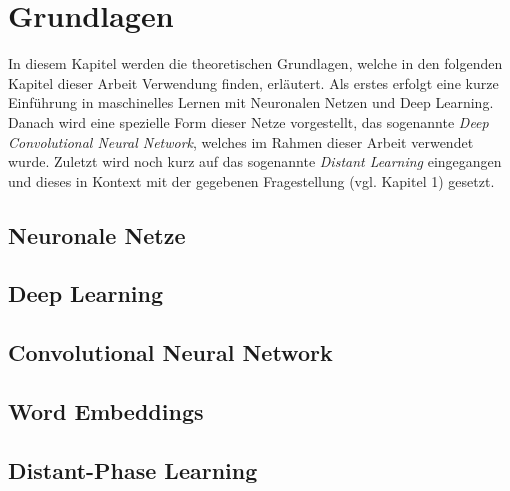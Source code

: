 \chapter{Grundlagen}
In diesem Kapitel werden die theoretischen Grundlagen, welche in den  folgenden Kapitel dieser Arbeit Verwendung finden, erläutert. Als erstes erfolgt eine kurze Einführung in maschinelles Lernen mit Neuronalen Netzen und Deep Learning. Danach wird eine spezielle Form dieser Netze vorgestellt, das sogenannte \emph{Deep Convolutional Neural Network}, welches im Rahmen dieser Arbeit verwendet wurde. Zuletzt wird noch kurz auf das sogenannte \emph{Distant Learning} \cite{DeriuMasterThesis} eingegangen und dieses in Kontext mit der gegebenen Fragestellung (vgl. Kapitel 1) gesetzt.

\section{Neuronale Netze}
\blindtext
\section{Deep Learning}
\blindtext
\section{Convolutional Neural Network}
\blindtext
\section{Word Embeddings}
\blindtext
\section{Distant-Phase Learning}
\blindtext
